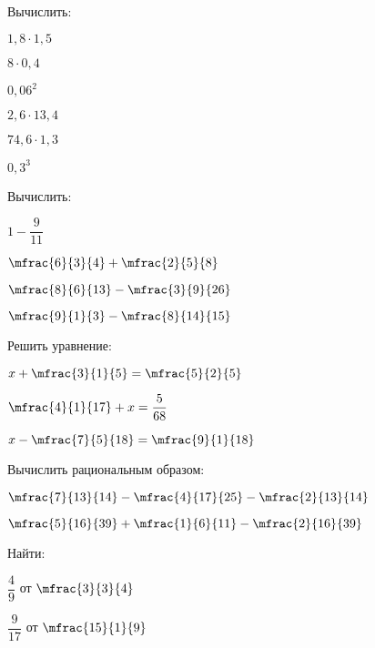 \begin{class}[number=2]
\begin{listofex}
			\item Вычислить:
			\begin{enumcols}[itemcolumns=6]
				\item \( 1,8\cdot1,5 \)
				\item \( 8\cdot0,4 \)
				\item \( 0,06^2 \)
				\item \( 2,6\cdot13,4\)
				\item \( 74,6\cdot1,3 \)
				\item \( 0,3^3 \)
			\end{enumcols}
		\end{listofex}
\end{class}
\begin{homework}[number=1]
	\begin{listofex}
		\item Вычислить:
		\begin{enumcols}[itemcolumns=4]
			\item \( 1-\dfrac{9}{11} \)
			\item \( \mfrac{6}{3}{4}+\mfrac{2}{5}{8} \)
			\item \( \mfrac{8}{6}{13}-\mfrac{3}{9}{26} \)
			\item \( \mfrac{9}{1}{3}-\mfrac{8}{14}{15} \)
		\end{enumcols}
		\item Решить уравнение:
		\begin{enumcols}[itemcolumns=3]
			\item \( x+\mfrac{3}{1}{5}=\mfrac{5}{2}{5} \)
			\item \( \mfrac{4}{1}{17}+x=\dfrac{5}{68} \)
			\item \( x-\mfrac{7}{5}{18}=\mfrac{9}{1}{18} \)
		\end{enumcols}
		\item Вычислить рациональным образом:
		\begin{enumcols}[itemcolumns=2]
		\item \( \mfrac{7}{13}{14}-\mfrac{4}{17}{25}-\mfrac{2}{13}{14} \)
		\item \( \mfrac{5}{16}{39}+\mfrac{1}{6}{11}-\mfrac{2}{16}{39} \)
		\end{enumcols}
		\item Найти:
		\begin{enumcols}[itemcolumns=3]
			\item \( \dfrac{4}{9} \) от \( \mfrac{3}{3}{4} \)
			\item \( \dfrac{9}{17} \) от \( \mfrac{15}{1}{9} \)

\end{enumcols}
\end{listofex}
\end{homework}
